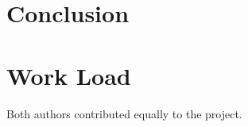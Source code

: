 \documentclass[conference]{IEEEtran}
\begin{document}
\section{Conclusion}


\section*{Work Load}

Both authors contributed equally to the project.






\end{document}
